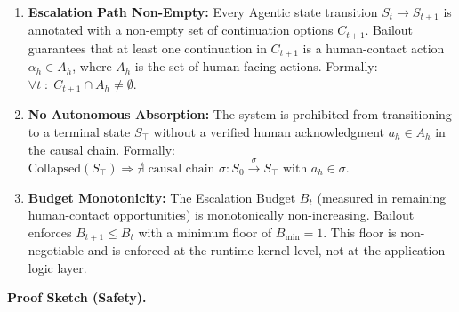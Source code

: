 \begin{enumerate}
    \item \textbf{Escalation Path Non-Empty:} Every Agentic state transition $S_t \to S_{t+1}$ is annotated with a non-empty set of continuation options $C_{t+1}$. Bailout guarantees that at least one continuation in $C_{t+1}$ is a human-contact action $\alpha_h \in A_h$, where $A_h$ is the set of human-facing actions. Formally: $\forall t \;:\; C_{t+1} \cap A_h \neq \emptyset$.

    \item \textbf{No Autonomous Absorption:} The system is prohibited from transitioning to a terminal state $S_\top$ without a verified human acknowledgment $a_h \in A_h$ in the causal chain. Formally: $\text{Collapsed}(S_\top) \Rightarrow \nexists \text{ causal chain } \sigma : S_0 \xrightarrow{\sigma} S_\top \text{ with } a_h \in \sigma$.

    \item \textbf{Budget Monotonicity:} The Escalation Budget $B_t$ (measured in remaining human-contact opportunities) is monotonically non-increasing. Bailout enforces $B_{t+1} \leq B_t$ with a minimum floor of $B_\text{min} = 1$. This floor is non-negotiable and is enforced at the runtime kernel level, not at the application logic layer.
\end{enumerate}

\textbf{Proof Sketch (Safety).}

